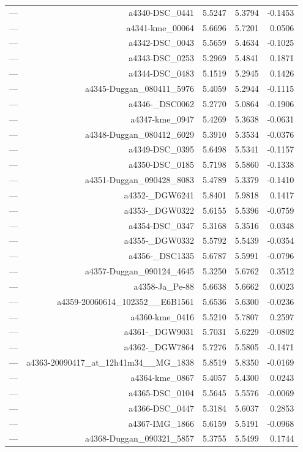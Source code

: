 \begin{table}[htbp]
\begin{tabular}{lrrrr}
— & a4340-DSC_0441 & 5.5247 & 5.3794 & -0.1453 \\
— & a4341-kme_00064 & 5.6696 & 5.7201 & 0.0506 \\
— & a4342-DSC_0043 & 5.5659 & 5.4634 & -0.1025 \\
— & a4343-DSC_0253 & 5.2969 & 5.4841 & 0.1871 \\
— & a4344-DSC_0483 & 5.1519 & 5.2945 & 0.1426 \\
— & a4345-Duggan_080411_5976 & 5.4059 & 5.2944 & -0.1115 \\
— & a4346-_DSC0062 & 5.2770 & 5.0864 & -0.1906 \\
— & a4347-kme_0947 & 5.4269 & 5.3638 & -0.0631 \\
— & a4348-Duggan_080412_6029 & 5.3910 & 5.3534 & -0.0376 \\
— & a4349-DSC_0395 & 5.6498 & 5.5341 & -0.1157 \\
— & a4350-DSC_0185 & 5.7198 & 5.5860 & -0.1338 \\
— & a4351-Duggan_090428_8083 & 5.4789 & 5.3379 & -0.1410 \\
— & a4352-_DGW6241 & 5.8401 & 5.9818 & 0.1417 \\
— & a4353-_DGW0322 & 5.6155 & 5.5396 & -0.0759 \\
— & a4354-DSC_0347 & 5.3168 & 5.3516 & 0.0348 \\
— & a4355-_DGW0332 & 5.5792 & 5.5439 & -0.0354 \\
— & a4356-_DSC1335 & 5.6787 & 5.5991 & -0.0796 \\
— & a4357-Duggan_090124_4645 & 5.3250 & 5.6762 & 0.3512 \\
— & a4358-Ja_Pe-88 & 5.6638 & 5.6662 & 0.0023 \\
— & a4359-20060614_102352__E6B1561 & 5.6536 & 5.6300 & -0.0236 \\
— & a4360-kme_0416 & 5.5210 & 5.7807 & 0.2597 \\
— & a4361-_DGW9031 & 5.7031 & 5.6229 & -0.0802 \\
— & a4362-_DGW7864 & 5.7276 & 5.5805 & -0.1471 \\
— & a4363-20090417_at_12h41m34__MG_1838 & 5.8519 & 5.8350 & -0.0169 \\
— & a4364-kme_0867 & 5.4057 & 5.4300 & 0.0243 \\
— & a4365-DSC_0104 & 5.5645 & 5.5576 & -0.0069 \\
— & a4366-DSC_0447 & 5.3184 & 5.6037 & 0.2853 \\
— & a4367-IMG_1866 & 5.6159 & 5.5191 & -0.0968 \\
— & a4368-Duggan_090321_5857 & 5.3755 & 5.5499 & 0.1744 \\

\end{tabular}
\end{table}
